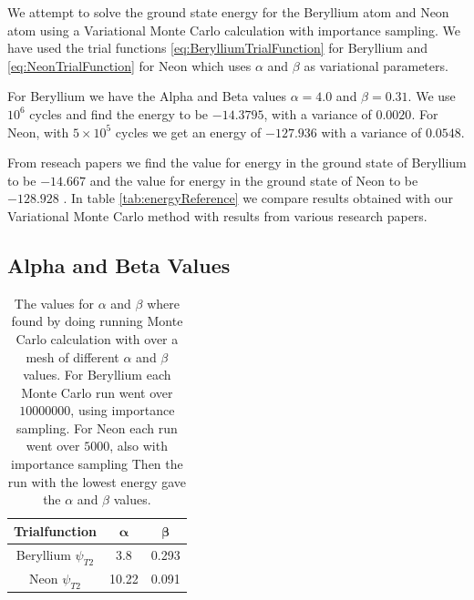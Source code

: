 \documentclass[11pt]{article}
\begin{document}
	We attempt to solve the ground state energy for the Beryllium atom and Neon atom using a Variational Monte Carlo calculation with importance sampling. We have used the trial functions \eqref{eq:BerylliumTrialFunction} for Beryllium and \eqref{eq:NeonTrialFunction} for Neon which uses $\alpha$ and $\beta$ as variational parameters.

	For Beryllium we have the Alpha and Beta values $\alpha=4.0$ and $\beta=0.31$. We use $10^{6}$ cycles and find the energy to be $-14.3795$, with a variance of $0.0020$.
	For Neon, with $5 \times 10^{5}$ cycles we get an energy of $-127.936$ with a variance of $0.0548$.

	From reseach papers we find the value for energy in the ground state
	of Beryllium to be $-14.667$ \cite{Koput:2011:PCCP} and the value
	for energy in the ground state of Neon to be \(-128.928\) \cite{QUA:QUA560090204}.
	In table \ref{tab:energyReference} we compare results
	obtained with our Variational Monte Carlo method with results from
	various research papers.


	\subsection{Alpha and Beta Values}
		\begin{table}
		\center
				\begin{tabular}{| c | c| c |}
				    \hline
				   	\textbf{Trialfunction} & \(\mathbf{\alpha}\) & \(\mathbf{\beta}\)
				    \\ \hline
				    Beryllium $\psi_{T2}$	& 3.8	&	 0.293
				    \\ \hline
				    Neon $\psi_{T2}$	&	10.22	&	0.091
				    \\	\hline
			  \end{tabular}
			  \caption{The values for \(\alpha\) and \( \beta \) where found by doing running Monte Carlo calculation with over a mesh of different \(\alpha\) and \( \beta \) values. For Beryllium each Monte Carlo run went over \(10 000 000\), using importance sampling. For Neon each run went over \(5 000\), also with importance sampling Then the run with the lowest energy gave the \(\alpha\) and \(\beta\) values.}
			  \label{tab:alpha_beta}
		\end{table}
\end{document}
